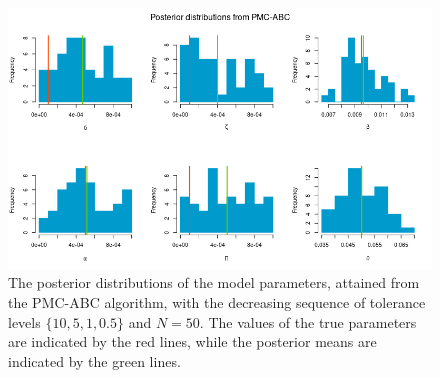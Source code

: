 \documentclass[]{article}
\begin{document}
\begin{figure}[H]
	\centering
	\includegraphics[width=1\linewidth]{../Figures/PMC_posteriors}
	\caption{The posterior distributions of the model parameters, attained from the PMC-ABC algorithm, with the decreasing sequence of tolerance levels $\{ 10, 5, 1, 0.5\}$ and $N=50$. The values of the true parameters are indicated by the red lines, while the posterior means are indicated by the green lines.}
	\label{pmc_abc_posteriors}
\end{figure}



\end{document}
